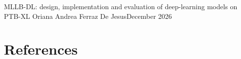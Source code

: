 \documentclass[11pt]{article}
\begin{document}
%
            {MLLB-DL: design, implementation and evaluation of deep-learning models on PTB-XL}%
            {Oriana Andrea Ferraz De Jesus}{December 2026}

\tableofcontents
\newpage


\newpage

\setcounter{section}{-1}










\clearpage
\section{References}
\begingroup
\renewcommand{\section}[2]{}


\endgroup

\newpage

\end{document}
